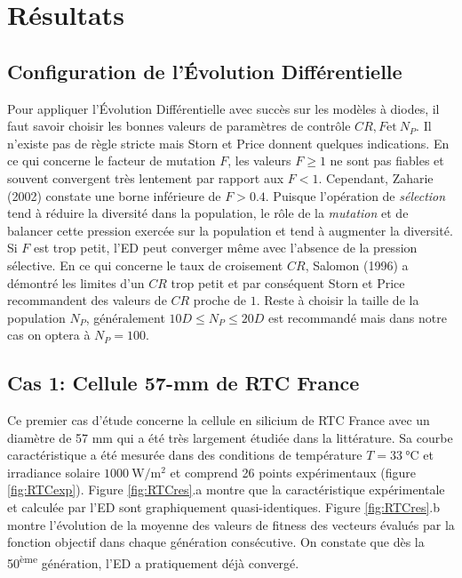 \section{Résultats}

\subsection{Configuration de l'Évolution Différentielle}
Pour appliquer l'Évolution Différentielle avec succès sur les modèles à diodes, il faut savoir choisir les bonnes valeurs de paramètres de contrôle $CR, F \text{et}\  N_P$. Il n'existe pas de règle stricte mais Storn et Price \cite{Price2005} donnent quelques indications. En ce qui concerne le facteur de mutation $F$, les valeurs $F \geq 1$ ne sont pas fiables et souvent convergent très lentement par rapport aux $F < 1$. Cependant, Zaharie (2002) \cite{Zaharie2002} constate une borne inférieure de $F > 0.4$. Puisque l'opération de \textit{sélection} tend à réduire la diversité dans la population, le rôle de la \textit{mutation} et de balancer cette pression exercée sur la population et tend à augmenter la diversité. Si $F$ est trop petit, l'ED peut converger même avec l'absence de la pression sélective. En ce qui concerne le taux de croisement $CR$, Salomon (1996) \cite{Salomon1996} a démontré les limites d'un $CR$ trop petit et par conséquent Storn et Price recommandent des valeurs de $CR$ proche de $1$. Reste à choisir la taille de la population $N_P$, généralement $10D \leq N_P \leq 20D$ est recommandé mais dans notre cas on optera à $N_P = 100$.

\subsection{Cas 1: Cellule 57-mm de RTC France}

Ce premier cas d'étude concerne la cellule en silicium de RTC France avec un diamètre de 57 mm qui a été très largement étudiée dans la littérature. Sa courbe caractéristique a été mesurée dans des conditions de température $T = \SI{33}{\celsius}$ et irradiance solaire $\SI{1000}{\watt\per\square\meter}$ et comprend 26 points expérimentaux (figure \ref{fig:RTCexp}). Figure \ref{fig:RTCres}.a montre que la caractéristique expérimentale et calculée par l'ED sont graphiquement quasi-identiques. Figure \ref{fig:RTCres}.b montre l'évolution de la moyenne des valeurs de fitness des vecteurs évalués par la fonction objectif dans chaque génération consécutive. On constate que dès la 50\textsuperscript{ème} génération, l'ED a pratiquement déjà convergé.

